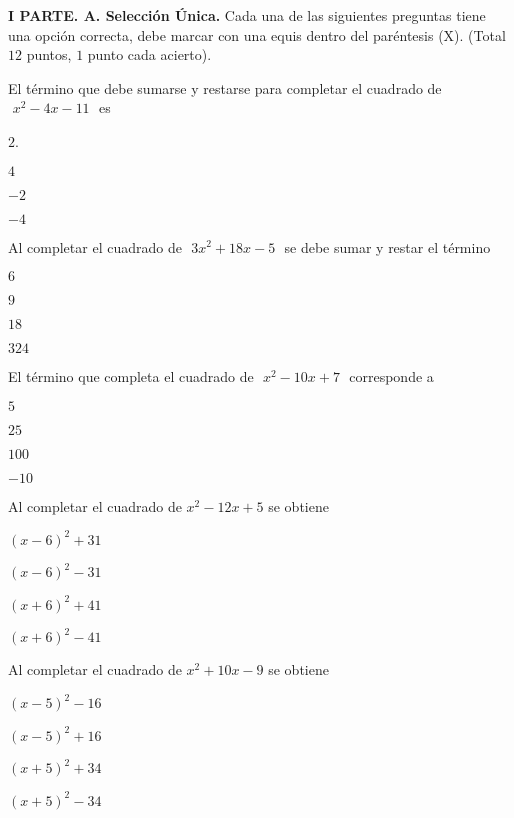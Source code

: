 \documentclass[12pt, fleqn]{article}
\begin{document}
\setcounter{page}{2} 

\vspace{-1.5cm}


\sf

{\bf I PARTE. A. Selección Única.} Cada una de las siguientes preguntas tiene una opción correcta, debe marcar con una equis dentro del paréntesis (X). (Total $12$ puntos, $1$ punto cada acierto).

\benu
\item El término que debe sumarse y restarse para completar el cuadrado de $\,\,x^2-4x-11\,\,$ es
\vp

\benu
\item[] \opc $2$. \vf
\item[] \opc $4$ \vf
\item[] \opc $-2$ \vf
\item[] \opc $-4$
\eenu
\vs

\item Al completar el cuadrado de $\,\,3x^2+18x-5\,\,$ se debe sumar y restar el término
\vp

\benu
\item[] \opc $6$\vf
\item[] \opc $9$\vf
\item[] \opc $18$\vf
\item[] \opc $324$
\eenu
\vs

\item El término que completa el cuadrado de $\,\,x^2-10x+7\,\,$ corresponde a \vp

\benu
\item[] \opc $5$
\item[] \opc $25$
\item[] \opc $100$
\item[] \opc $-10$
\eenu
\vs

\item Al completar el cuadrado de $x^2-12x+5$ se obtiene \vp

\benu
\item[] \opc $(x-6)^2+31$
\item[] \opc $(x-6)^2-31$
\item[] \opc $(x+6)^2+41$
\item[] \opc $(x+6)^2-41$
\eenu
\vs

\pagebreak

\item Al completar el cuadrado de $x^2+10x-9$ se obtiene \vp

\benu
\item[] \opc $(x-5)^2-16$ \vp
\item[] \opc $(x-5)^2+16$ \vp
\item[] \opc $(x+5)^2+34$ \vp
\item[] \opc $(x+5)^2-34$
\eenu
\vs
\end{document}
